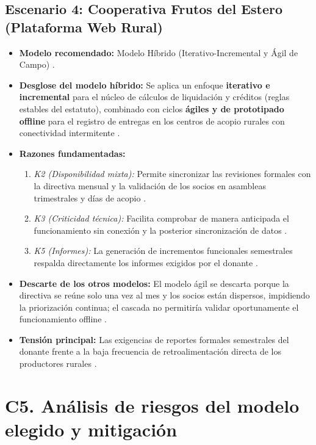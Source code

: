 \documentclass{article}
\begin{document}
\subsection{Escenario 4: Cooperativa Frutos del Estero (Plataforma Web Rural)}
\begin{itemize}
    \item \textbf{Modelo recomendado:} Modelo Híbrido (Iterativo-Incremental y Ágil de Campo) \cite{GA_Prac_01}.
    \item \textbf{Desglose del modelo híbrido:} Se aplica un enfoque \textbf{iterativo e incremental} para el núcleo de cálculos de liquidación y créditos (reglas estables del estatuto), combinado con ciclos \textbf{ágiles y de prototipado offline} para el registro de entregas en los centros de acopio rurales con conectividad intermitente \cite{GA_Prac_01}.
    \item \textbf{Razones fundamentadas:}
        \begin{enumerate}
            \item \textit{K2 (Disponibilidad mixta):} Permite sincronizar las revisiones formales con la directiva mensual y la validación de los socios en asambleas trimestrales y días de acopio \cite{GA_Prac_01}.
            \item \textit{K3 (Criticidad técnica):} Facilita comprobar de manera anticipada el funcionamiento sin conexión y la posterior sincronización de datos \cite{GA_Prac_01}.
            \item \textit{K5 (Informes):} La generación de incrementos funcionales semestrales respalda directamente los informes exigidos por el donante \cite{GA_Prac_01}.
        \end{enumerate}
    \item \textbf{Descarte de los otros modelos:} El modelo ágil se descarta porque la directiva se reúne solo una vez al mes y los socios están dispersos, impidiendo la priorización continua; el cascada no permitiría validar oportunamente el funcionamiento offline \cite{GA_Prac_01}.
    \item \textbf{Tensión principal:} Las exigencias de reportes formales semestrales del donante frente a la baja frecuencia de retroalimentación directa de los productores rurales \cite{GA_Prac_01}.
\end{itemize}

\section{C5. Análisis de riesgos del modelo elegido y mitigación}
\end{document}
